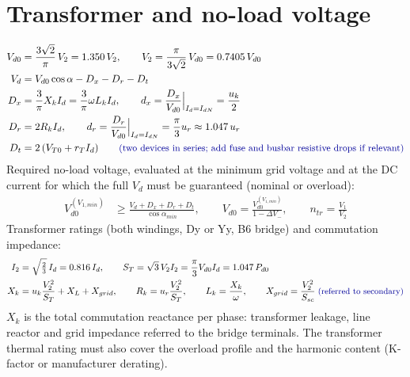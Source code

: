 \documentclass[10pt,a4paper]{scrartcl}
\newcommand{\Vdo}{V_{d0}}
\newcommand{\Vd}{V_{d}}
\newcommand{\Id}{I_{d}}
\newcommand{\Vll}{V_{2}}
\newcommand{\Xk}{X_{k}}
\newcommand{\Lk}{L_{k}}
\newcommand{\Rk}{R_{k}}
\newcommand{\uk}{u_{k}}
\newcommand{\ur}{u_{r}}
\newcommand{\Dx}{D_{x}}
\newcommand{\Dr}{D_{r}}
\newcommand{\Dt}{D_{t}}
\newcommand{\rt}[1]{\text{\small\color{blue!60!black} #1}}
\begin{document}
\section{Transformer and no-load voltage}
\begin{align}
\Vdo &= \frac{3\sqrt2}{\pi}\,\Vll = 1.350\,\Vll, \qquad \Vll = \frac{\pi}{3\sqrt2}\,\Vdo = 0.7405\,\Vdo \label{eq:V2}\\
\Vd &= \Vdo\cos\alpha - \Dx - \Dr - \Dt \label{eq:Vd}\\
\Dx &= \frac{3}{\pi}\Xk\Id = \frac{3}{\pi}\omega\Lk\Id, \qquad d_x = \frac{\Dx}{\Vdo}\Big|_{\Id=I_{dN}} = \frac{\uk}{2} \label{eq:Dx}\\
\Dr &= 2\Rk\Id, \qquad d_r = \frac{\Dr}{\Vdo}\Big|_{\Id=I_{dN}} = \frac{\pi}{3}\ur \approx 1.047\,\ur \label{eq:Dr}\\
\Dt &= 2\,(V_{T0} + r_T\Id) \qquad \rt{(two devices in series; add fuse and busbar resistive drops if relevant)} \label{eq:Dt}
\end{align}
Required no-load voltage, evaluated at the minimum grid voltage and at the DC current for which the full $\Vd$ must be guaranteed (nominal or overload):
\begin{align}
\Vdo^{(V_{1,min})} &\ge \frac{\Vd + \Dx + \Dr + \Dt}{\cos\alpha_{min}}, \qquad
\Vdo = \frac{\Vdo^{(V_{1,min})}}{1-\Delta V_-}, \qquad
n_{tr} = \frac{V_1}{\Vll} \label{eq:Vdoreq}
\end{align}
Transformer ratings (both windings, Dy or Yy, B6 bridge) and commutation impedance:
\begin{align}
I_2 &= \sqrt{\tfrac{2}{3}}\,\Id = 0.816\,\Id, \qquad
S_T = \sqrt3\,\Vll I_2 = \frac{\pi}{3}\Vdo\Id = 1.047\,P_{d0} \label{eq:ST}\\
\Xk &= \uk\frac{\Vll^2}{S_T} + X_{L} + X_{grid}, \qquad
\Rk = \ur\frac{\Vll^2}{S_T}, \qquad
\Lk = \frac{\Xk}{\omega}, \qquad
X_{grid} = \frac{\Vll^2}{S_{sc}}\;\rt{(referred to secondary)} \label{eq:Xk}
\end{align}
$\Xk$ is the total commutation reactance per phase: transformer leakage, line reactor and grid impedance referred to the bridge terminals. The transformer thermal rating must also cover the overload profile and the harmonic content (K-factor or manufacturer derating).

\end{document}
